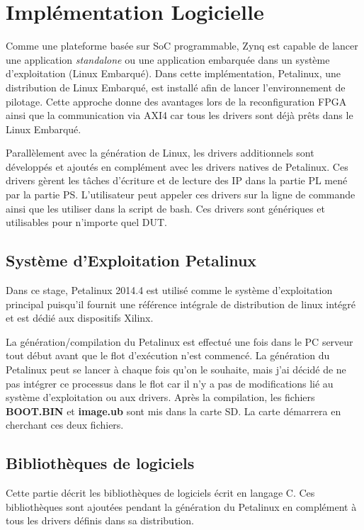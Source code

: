 \section{Implémentation Logicielle}

Comme une plateforme basée sur SoC programmable, Zynq est capable de lancer une application \emph{standalone}
ou une application embarquée dans un système d'exploitation (Linux Embarqué). Dans cette implémentation,
Petalinux, une distribution de Linux Embarqué, est installé afin de lancer l'environnement de pilotage.
Cette approche donne des avantages lors de la reconfiguration FPGA ainsi que la communication via
AXI4 car tous les drivers sont déjà prêts dans le Linux Embarqué.

Parallèlement avec la génération de Linux, les drivers additionnels sont développés et ajoutés en complément
avec les drivers natives de Petalinux. Ces drivers gèrent les tâches d'écriture et de lecture des IP dans la partie PL mené
par la partie PS. L'utilisateur peut appeler ces drivers sur la ligne de commande ainsi que les utiliser dans la script
de bash. Ces drivers sont génériques et utilisables pour n'importe quel DUT.


\subsection{Système d'Exploitation Petalinux}

Dans ce stage, Petalinux 2014.4 est utilisé comme le système d'exploitation principal puisqu'il fournit une référence
intégrale de distribution de linux intégré et est dédié aux dispositifs Xilinx.

La génération/compilation du Petalinux est effectué une fois dans le PC serveur tout début avant que le flot d'exécution n'est commencé.
La génération du Petalinux peut se lancer à chaque fois qu'on le souhaite, mais j'ai décidé de ne pas intégrer ce processus dans le flot
car il n'y a pas de modifications lié au système d'exploitation ou aux drivers.
Après la compilation, les fichiers \textbf{BOOT.BIN} et \textbf{image.ub} sont mis dans la carte SD. La carte démarrera
en cherchant ces deux fichiers.

\subsection{Bibliothèques de logiciels}
\label{subsec:embedded}

Cette partie décrit les bibliothèques de logiciels écrit en langage C. Ces bibliothèques sont ajoutées  
pendant la génération du Petalinux en complément à tous les drivers définis dans sa distribution.

